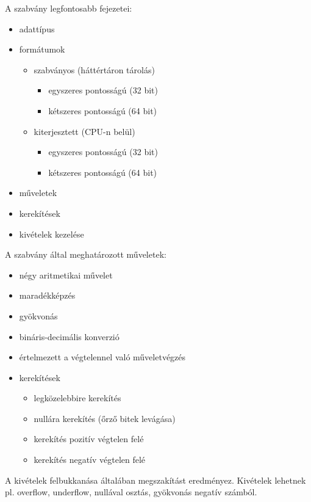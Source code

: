 A szabvány legfontosabb fejezetei:
\begin{itemize}
    \item adattípus
    \item formátumok
    \begin{itemize}
        \item szabványos (háttértáron tárolás)
        \begin{itemize}
            \item egyszeres pontosságú (32 bit)
            \item kétszeres pontosságú (64 bit)
        \end{itemize}
        \item kiterjesztett (CPU-n belül)
        \begin{itemize}
            \item egyszeres pontosságú (32 bit)
            \item kétszeres pontosságú (64 bit)
        \end{itemize}
    \end{itemize}
    \item műveletek
    \item kerekítések
    \item kivételek kezelése
\end{itemize}

A szabvány által meghatározott műveletek:
\begin{itemize}
    \item négy aritmetikai művelet
    \item maradékképzés
    \item gyökvonás
    \item bináris-decimális konverzió
    \item értelmezett a végtelennel való műveletvégzés
    \item kerekítések
    \begin{itemize}
        \item legközelebbire kerekítés
        \item nullára kerekítés (őrző bitek levágása)
        \item kerekítés pozitív végtelen felé
        \item kerekítés negatív végtelen felé
    \end{itemize}
\end{itemize}

A kivételek felbukkanása általában megszakítást eredményez.
Kivételek lehetnek pl. overflow, underflow, nullával osztás, gyökvonás negatív számból.

